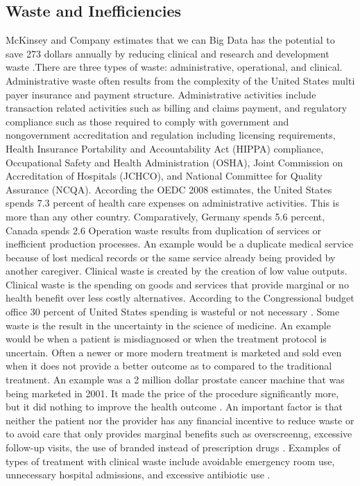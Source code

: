 \documentclass[sigconf]{acmart}
\begin{document}
\subsection{Waste and Inefficiencies}
McKinsey and Company estimates that we can Big Data has the potential to save 273 dollars annually by reducing clinical and research and development waste \cite{springer}.There are three types of waste: administrative, operational, and clinical. 
Administrative waste often results from the complexity of the United States multi payer insurance and payment structure.  Administrative activities include transaction related activities such as billing and claims payment, and regulatory compliance such as those required to comply with government and nongovernment accreditation and regulation including licensing requirements, Health Insurance Portability and Accountability Act (HIPPA) compliance, Occupational Safety and Health Administration (OSHA),  Joint Commission on Accreditation of Hospitals (JCHCO), and National Committee for Quality Assurance (NCQA).  According the OEDC 2008 estimates, the United States spends 7.3 percent of health care expenses on administrative activities. This is more than any other country. Comparatively, Germany spends 5.6 percent, Canada spends 2.6%
 Operation waste results from duplication of services or inefficient production processes.  An example would be a duplicate medical service because of lost medical records or the same service already being provided by another caregiver.
Clinical waste is created by the creation of low value outputs. Clinical waste is the spending on goods and services that provide marginal or no health benefit over less costly alternatives.  According to the Congressional budget office 30 percent of United States spending is wasteful or not necessary \cite{consumer}.  Some waste is the result in the uncertainty in the science of medicine. An example would be when a patient is misdiagnosed or when the treatment protocol is uncertain. Often a newer or more modern treatment is marketed and sold even when it does not provide a better outcome as to compared to the traditional treatment. An example was a 2 million dollar prostate cancer machine that was being marketed in 2001. It made the price of the procedure significantly more, but it did nothing to improve the health outcome \cite{consumer}.  An important factor is that neither the patient nor the provider has any financial incentive to reduce waste or to avoid care that only provides marginal benefits such as overscreenng, excessive follow-up visits, the use of branded instead of prescription drugs \cite{milbank}.  Examples of types of treatment with clinical waste include avoidable emergency room use, unnecessary hospital admissions, and excessive antibiotic use \cite{milbank}. 
\end{document}
